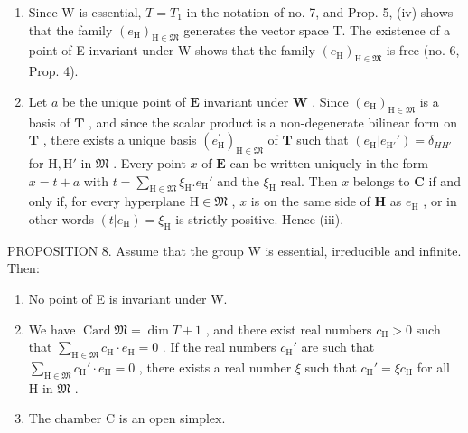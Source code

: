 \begin{enumerate}
\def\labelenumi{(\roman{enumi})}
\setcounter{enumi}{1}
\item
  Since W is essential, \(T = T_{1}\) in the notation of no. 7, and Prop. 5, (iv) shows that the family \((e_{\mathrm{H}})_{\mathrm{H}\in\mathfrak{M}}\) generates the vector space T. The existence of a point of E invariant under W shows that the family \((e_{\mathrm{H}})_{\mathrm{H}\in\mathfrak{M}}\) is free (no. 6, Prop. 4).
\item
  Let \(a\) be the unique point of \(\mathbf{E}\) invariant under \(\mathbf{W}\) . Since \((e_{\mathrm{H}})_{\mathrm{H}\in \mathfrak{M}}\) is a basis of \(\mathbf{T}\) , and since the scalar product is a non-degenerate bilinear form on \(\mathbf{T}\) , there exists a unique basis \((e_{\mathrm{H}}^{\prime})_{\mathrm{H}\in \mathfrak{M}}\) of \(\mathbf{T}\) such that \((e_{\mathrm{H}}|e_{\mathrm{H}'}') = \delta_{HH'}\) for \(\mathrm{H},\mathrm{H}'\) in \(\mathfrak{M}\) . Every point \(x\) of \(\mathbf{E}\) can be written uniquely in the form \(x = t + a\) with \(t = \sum_{\mathrm{H}\in \mathfrak{M}}\xi_{\mathrm{H}}.e_{\mathrm{H}}'\) and the \(\xi_{\mathrm{H}}\) real. Then \(x\) belongs to \(\mathbf{C}\) if and only if, for every hyperplane \(\mathrm{H}\in \mathfrak{M}\) , \(x\) is on the same side of \(\mathbf{H}\) as \(e_{\mathrm{H}}\) , or in other words \((t|e_{\mathrm{H}}) = \xi_{\mathrm{H}}\) is strictly positive. Hence (iii).
\end{enumerate}

PROPOSITION 8. Assume that the group W is essential, irreducible and infinite. Then:

\begin{enumerate}
\def\labelenumi{(\roman{enumi})}
\item
  No point of E is invariant under W.
\item
  We have \(\operatorname{Card} \mathfrak{M} = \dim T + 1\) , and there exist real numbers \(c_{\mathrm{H}} > 0\) such that \(\sum_{\mathrm{H} \in \mathfrak{M}} c_{\mathrm{H}} \cdot e_{\mathrm{H}} = 0\) . If the real numbers \(c_{\mathrm{H}}'\) are such that \(\sum_{\mathrm{H} \in \mathfrak{M}} c_{\mathrm{H}}' \cdot e_{\mathrm{H}} = 0\) , there exists a real number \(\xi\) such that \(c_{\mathrm{H}}' = \xi c_{\mathrm{H}}\) for all H in \(\mathfrak{M}\) .
\item
  The chamber C is an open simplex.
\end{enumerate}

